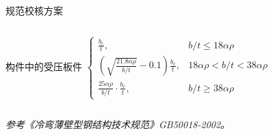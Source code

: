 \begin{frame}{规范校核方案}
\begin{columns}[T]
        \begin{exampleblock}{构件中的受压板件}
            \centering \scriptsize
            \vspace{2pt}
            \(\displaystyle 
            \begin{cases}
            \frac{b_c}{t}, & b/t \le 18\alpha\rho \\[0.4em]
            \left(\sqrt{\frac{21.8\alpha\rho}{b/t}} - 0.1\right)\frac{b_c}{t}, & 18\alpha\rho < b/t < 38\alpha\rho \\[0.4em]
            \frac{25\alpha\rho}{b/t} \cdot \frac{b_c}{t}, & b/t \ge 38\alpha\rho
            \end{cases}\)
            \vspace{8pt}
        \end{exampleblock}
\end{columns}

\vspace{6pt}
\textit{\footnotesize*参考《冷弯薄壁型钢结构技术规范》GB50018-2002。 }
\end{frame}